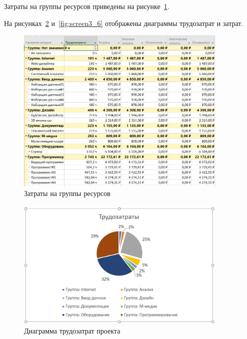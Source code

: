Затраты на группы ресурсов приведены на рисунке~\ref{fig:screen3_7}.

На рисунках~\ref{fig:screen3_5} и~\ref{fig:screen3_6} отображены диаграммы трудозатрат и затрат.

\begin{figure}[H]
	\centering
	\includegraphics[width=0.9\textwidth]{img/lab3/task3/screen10.jpg}
	\caption{Затраты на группы ресурсов}
	\label{fig:screen3_7}
\end{figure}

\begin{figure}[H]
	\centering
	\includegraphics[width=0.9\textwidth]{img/lab3/task3/screen5.jpg}
	\caption{Диаграмма трудозатрат проекта}
	\label{fig:screen3_5}
\end{figure}

